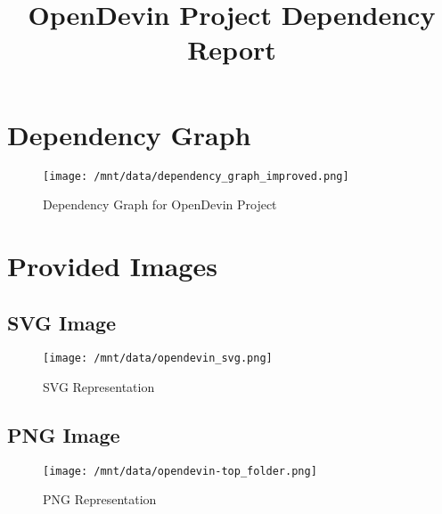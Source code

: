 \documentclass{article}
\title{OpenDevin Project Dependency Report}
\author{}
\date{}
\begin{document}
\maketitle

\section*{Dependency Graph}
\begin{figure}[h!]
    \centering
    \texttt{[image: /mnt/data/dependency\_graph\_improved.png]}
    \caption{Dependency Graph for OpenDevin Project}
\end{figure}

\newpage
\section*{Provided Images}

\subsection*{SVG Image}
\begin{figure}[h!]
    \centering
    \texttt{[image: /mnt/data/opendevin\_svg.png]}
    \caption{SVG Representation}
\end{figure}

\newpage
\subsection*{PNG Image}
\begin{figure}[h!]
    \centering
    \texttt{[image: /mnt/data/opendevin-top\_folder.png]}
    \caption{PNG Representation}
\end{figure}

\newpage
\end{document}
